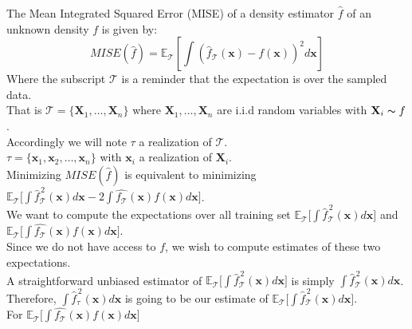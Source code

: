 \begin{notechapter}
    The Mean Integrated Squared Error (MISE) of a density estimator $\hat{f}$ of an unknown density $f$ is given by:
    \begin{equation}
    MISE(\hat{f})= \mathbb{E}_\mathbf{\mathcal{T}} \left[\int \left(\hat{f}_{\mathcal{T}}(\mathbf{x}) - f(\mathbf{x})\right)^2 d\mathbf{x}\right]
    \end{equation}
    Where the subscript $\mathbf{\mathcal{T}}$ is a reminder that the expectation is over the sampled data.\\[6pt]
    That is $\mathbf{\mathcal{T}} = \{\mathbf{X}_{1}, \dots, \mathbf{X}_{n}\}$ where 
    $\mathbf{X}_{1}, \dots, \mathbf{X}_{n}$ are i.i.d random variables with $\mathbf{X}_i \thicksim f$. \\[6pt]
    Accordingly we will note $\tau$ a realization of $\mathcal{T}$.\\[6pt]
    $\tau =\{\mathbf{x}_1, \mathbf{x}_2, \dots, \mathbf{x}_n\}$ with 
    $\mathbf{x}_i$ a realization of $\mathbf{X}_i$.
    \\[10pt]
    Minimizing $MISE(\hat{f})$ is equivalent to minimizing 
    $\mathbb{E}_\mathbf{\mathcal{T}} \bigg[ \displaystyle\int \hat{f}_{\mathcal{T}}^{\, 2}(\mathbf{x})d\mathbf{x} -2 \displaystyle\int \hat{f_{\mathcal{T}}}(\mathbf{x}) f(\mathbf{x}) d\mathbf{x} \bigg]$.
    \\[10pt]
    We want to compute the expectations over all training set
    $\mathbb{E}_\mathbf{\mathcal{T}} \bigg[ \displaystyle\int \hat{f}_{\mathcal{T}}^{\, 2}(\mathbf{x})d\mathbf{x} \bigg]$
    and
    $\mathbb{E}_\mathbf{\mathcal{T}} \bigg[ \displaystyle\int \hat{f_{\mathcal{T}}}(\mathbf{x}) f(\mathbf{x}) d\mathbf{x} \bigg]$.
    \\[10pt]
    Since we do not have access to $f$, we wish to compute estimates of these two expectations.\\[10pt]
    A straightforward unbiased estimator of 
    $\mathbb{E}_\mathbf{\mathcal{T}} \bigg[ \displaystyle\int \hat{f}_{\mathcal{T}}^{\, 2}(\mathbf{x})d\mathbf{x} \bigg]$
     is simply 
    $\displaystyle\int \hat{f}_{\mathcal{T}}^{\, 2}(\mathbf{x})d\mathbf{x}$.\\[6pt]
    Therefore, $\displaystyle\int \hat{f}_{\tau}^{\, 2}(\mathbf{x})d\mathbf{x}$ is going to be our estimate of 
    $\mathbb{E}_\mathbf{\mathcal{T}} \bigg[ \displaystyle\int \hat{f}_{\mathcal{T}}^{\, 2}(\mathbf{x})d\mathbf{x} \bigg]$.\\[10pt]
    For $\mathbb{E}_\mathbf{\mathcal{T}} \bigg[ \displaystyle\int \hat{f_{\mathcal{T}}}(\mathbf{x}) f(\mathbf{x}) d\mathbf{x} \bigg]$

\end{notechapter}
